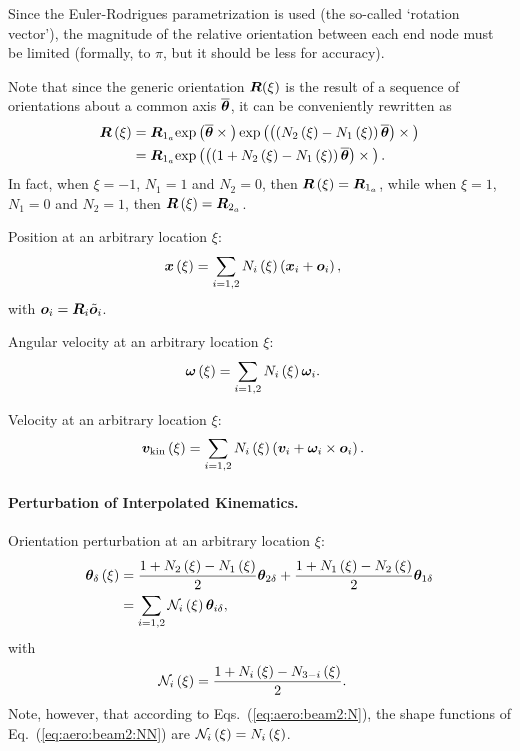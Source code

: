 Since the Euler-Rodrigues parametrization is used
(the so-called `rotation vector'),
the magnitude of the relative orientation between each end node
must be limited (formally, to $\pi$, but it should be less for accuracy).

Note that since the generic orientation $\bm{R}(\xi)$
is the result of a sequence of orientations
about a common axis $\overline{\bm{\theta}}$,
it can be conveniently rewritten as
\begin{align}
	\bm{R}\left( \xi \right)
	&= \bm{R}_{1_a} \text{exp}\left( \overline{\bm{\theta}}\times{} \right)
		\text{exp}\left( \left( \left( N_2\left( \xi \right) - N_1\left( \xi \right) \right) \overline{\bm{\theta}} \right)\times{} \right)
	\nonumber \\
	&= \bm{R}_{1_a} 
		\text{exp}\left( \left( \left( 1 + N_2\left( \xi \right) - N_1\left( \xi \right) \right) \overline{\bm{\theta}} \right)\times{} \right)
	.
\end{align}
In fact, when $\xi=-1$, $N_1=1$ and $N_2=0$,
then $\bm{R}\left( \xi \right)=\bm{R}_{1_a}$,
while when $\xi=1$, $N_1=0$ and $N_2=1$,
then $\bm{R}\left( \xi \right)=\bm{R}_{2_a}$.

Position at an arbitrary location $\xi$:
\begin{align}
	\bm{x}\left( \xi \right)
	&=
	\sum_{i=1,2} N_i\left( \xi \right) \left( 
		\bm{x}_i + \bm{o}_i
	 \right)
	,
\end{align}
with $\bm{o}_i=\bm{R}_i \tilde{\bm{o}}_i$.

Angular velocity at an arbitrary location $\xi$:
\begin{align}
	\bm{\omega}\left( \xi \right)
	&=
	\sum_{i=1,2} N_i\left( \xi \right) \bm{\omega}_i
	.
\end{align}

Velocity at an arbitrary location $\xi$:
\begin{align}
	\bm{v}_{\text{kin}}\left( \xi \right)
	&=
	\sum_{i=1,2} N_i\left( \xi \right) \left( 
		\bm{v}_i
		+ \bm{\omega}_i \times \bm{o}_i
	 \right)
	.
\end{align}

\paragraph{Perturbation of Interpolated Kinematics.}
Orientation perturbation at an arbitrary location $\xi$:
\begin{align}
	\bm{\theta}_{\delta}\left( \xi \right)
	&=
	\frac{1 + N_2\left( \xi \right) - N_1\left( \xi \right)}{2} \bm{\theta}_{2\delta}
	+ \frac{1 + N_1\left( \xi \right) - N_2\left( \xi \right)}{2} \bm{\theta}_{1\delta}
	\\
	&=
	\sum_{i=1,2} \mathcal{N}_i\left( \xi \right) \bm{\theta}_{i\delta}
	,
\end{align}
with
\begin{subequations}
\begin{align}
	\mathcal{N}_i\left( \xi \right)
	&=
	\frac{1 + N_i\left( \xi \right) - N_{3-i}\left( \xi \right)}{2}
	\label{eq:aero:beam2:NN}
	.
\end{align}
\end{subequations}
Note, however, that according to Eqs.~(\ref{eq:aero:beam2:N}),
the shape functions of Eq.~(\ref{eq:aero:beam2:NN})
are $\mathcal{N}_i\left( \xi \right)=N_i\left( \xi \right)$.

